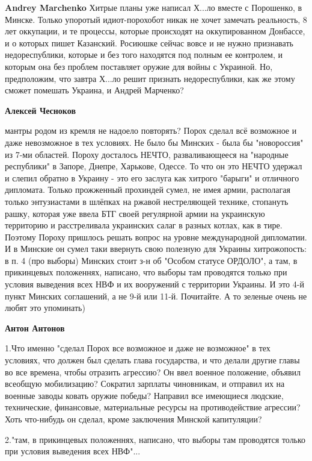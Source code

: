 \begin{itemize}
\begin{itemize}
\textbf{Andrey Marchenko} Хитрые планы уже написал Х...ло вместе с Порошенко, в Минске. Только упоротый идиот-порохобот никак не хочет замечать реальность, 8 лет оккупации, и те процессы, которые происходят на оккупированном Донбассе, и о которых пишет Казанский. Росиюшке сейчас вовсе и не нужно признавать недореспублики, которые и без того находятся под полным ее контролем, и которым она без проблем поставляет оружие для войны с Украиной. Но, предположим, что завтра Х...ло решит признать недореспублики, как же этому сможет помешать Украина, и Андрей Марченко?

\textbf{Алексей Чесноков} 

мантры родом из кремля не надоело повторять? Порох сделал всё возможное и даже
невозможное в тех условиях. Не было бы Минских - была бы "новороссия" из 7-ми
областей. Пороху досталось НЕЧТО, разваливающееся на "народные республики" в
Запоре, Днепре, Харькове, Одессе. То что он это НЕЧТО удержал и слепил обратно
в Украину - это его заслуга как хитрого "барыги" и отличного дипломата. Только
прожженный прохиндей сумел, не имея армии, располагая только энтузиастами в
шлёпках на ржавой нестреляющей технике, стопануть рашку, которая уже ввела БТГ
своей регулярной армии на украинскую территорию и расстреливала украинских
салаг в разных котлах, как в тире. Поэтому Пороху пришлось решать вопрос на
уровне международной дипломатии. И в Минские он сумел таки ввернуть свою
полезную для Украины хитрожопость: в п. 4 (про выборы) Минских стоит з-н об
"Особом статусе ОРДОЛО", а там, в прикинцевых положеннях, написано, что выборы
там проводятся только при условия выведения всех НВФ и их вооружений с
территории Украины. И это 4-й пункт Минских соглашений, а не 9-й или 11-й.
Почитайте. А то зеленые очень не любят это упоминать)

\textbf{Антон Антонов} 

1.Что именно "сделал Порох все возможное и даже не возможное" в тех условиях,
что должен был сделать глава государства, и что делали другие главы во все
времена, чтобы отразить агрессию? Он ввел военное положение, объявил всеобщую
мобилизацию? Сократил зарплаты чиновникам, и отправил их на военные заводы
ковать оружие победы? Направил все имеющиеся людские, технические, финансовые,
материальные ресурсы на противодействие агрессии? Хоть что-нибудь он сделал,
кроме заключения Минской капитуляции? 

2."там, в прикинцевых положеннях, написано, что выборы там проводятся только
при условия выведения всех НВФ"...


\end{itemize}
\end{itemize}
